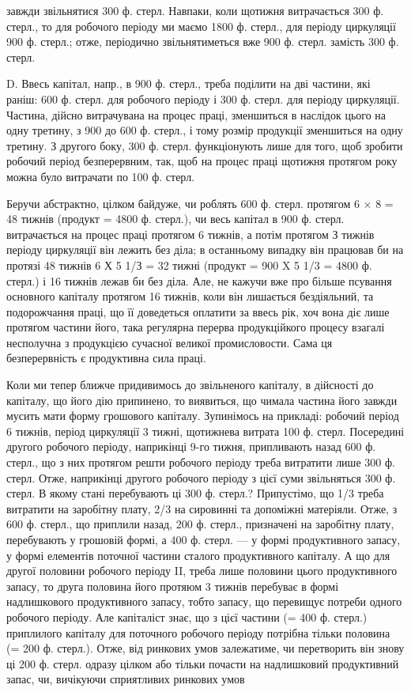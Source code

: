 \parcont{}  %
завжди звільнятися 300 ф. стерл. Навпаки, коли щотижня витрачається
300 ф. стерл., то для робочого періоду ми маємо 1800 ф. стерл., для періоду
циркуляції 900 ф. стерл.; отже, періодично звільнятиметься вже 900 ф. стерл.
замість 300 ф. стерл.

D. Ввесь капітал, напр., в 900 ф. стерл., треба поділити на дві частини,
які раніш: 600 ф. стерл. для робочого періоду і 300 ф. стерл. для періоду
циркуляції. Частина, дійсно витрачувана на процес праці, зменшиться в
наслідок цього на одну третину, з 900 до 600 ф. стерл., і тому розмір продукції
зменшиться на одну третину. З другого боку, 300 ф. стерл.
функціонують лише для того, щоб зробити робочий період безперервним,
так, щоб на процес праці щотижня протягом року можна було витрачати
по 100 ф. стерл.

Беручи абстрактно, цілком байдуже, чи роблять 600 ф. стерл. протягом
6 × 8 = 48 тижнів (продукт = 4800 ф. стерл.), чи весь капітал в 900 ф. стерл.
витрачається на процес праці протягом 6 тижнів, а потім протягом
З тижнів періоду циркуляції він лежить без діла; в останньому випадку
він працював би на протязі 48 тижнів 6 Х 5 1/З = 32 тижні (продукт =
900 X 5 1/3 = 4800 ф. стерл.) і 16 тижнів лежав би без діла. Але, не кажучи
вже про більше псування основного капіталу протягом 16 тижнів, коли
він лишається бездіяльний, та подорожчання праці, що її доведеться оплатити
за ввесь рік, хоч вона діє лише протягом частини його, така регулярна
перерва продукційкого процесу взагалі несполучна з продукцією
сучасної великої промисловости. Сама ця безперервність є продуктивна
сила праці.

Коли ми тепер ближче придивимось до звільненого капіталу, в дійсності
до капіталу, що його дію припинено, то виявиться, що чимала
частина його завжди мусить мати форму грошового капіталу. Зупинімось
на прикладі: робочий період 6 тижнів, період циркуляції 3 тижні, щотижнева
витрата 100 ф. стерл. Посередині другого робочого періоду,
наприкінці 9-го тижня, припливають назад 600 ф. стерл., що з них протягом
решти робочого періоду треба витратити лише 300 ф. стерл.
Отже, наприкінці другого робочого періоду з цієї суми звільняться
300 ф. стерл. В якому стані перебувають ці 300 ф. стерл.? Припустімо,
що 1/3 треба витратити на заробітну плату, 2/3 на сировинні та допоміжні
матеріяли. Отже, з 600 ф. стерл., що приплили назад, 200 ф. стерл., призначені
на заробітну плату, перебувають у грошовій формі, а 400 ф.
стерл. — у формі продуктивного запасу, у формі елементів поточної
частини сталого продуктивного капіталу. А що для другої половини
робочого періоду II, треба лише половини цього продуктивного запасу,
то друга половина його протяюм 3 тижнів перебуває в формі надлишкового
продуктивного запасу, тобто запасу, що перевищує потреби одного
робочого періоду. Але капіталіст знає, що з цієї частини (= 400 ф. стерл.)
приплилого капіталу для поточного робочого періоду потрібна тільки
половина (= 200 ф. стерл.). Отже, від ринкових умов залежатиме, чи
перетворить він знову ці 200 ф. стерл. одразу цілком або тільки почасти на
надлишковий продуктивний запас, чи, вичікуючи сприятливих ринкових умов
\parbreak{}  %
